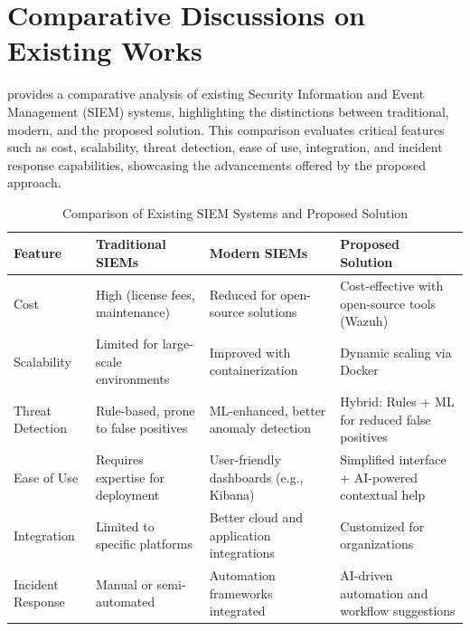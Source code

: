 \section{Comparative Discussions on Existing Works}
\label{sec_comparative_discussions}

 provides a comparative analysis of existing Security Information and Event Management (SIEM) systems, highlighting the distinctions between traditional, modern, and the proposed solution. This comparison evaluates critical features such as cost, scalability, threat detection, ease of use, integration, and incident response capabilities, showcasing the advancements offered by the proposed approach.

\begin{table}[h!]
\centering
\begin{tabular}{p{2.3cm}p{2.7cm}p{2.9cm}p{4cm}}
\hline
\textbf{Feature} & \textbf{Traditional SIEMs} & \textbf{Modern SIEMs} & \textbf{Proposed Solution} \\
\hline
Cost & High (license fees, maintenance) & Reduced for open-source solutions & Cost-effective with open-source tools (Wazuh) \\
Scalability & Limited for large-scale environments & Improved with containerization & Dynamic scaling via Docker \\
Threat Detection & Rule-based, prone to false positives & ML-enhanced, better anomaly detection & Hybrid: Rules + ML for reduced false positives \\
Ease of Use & Requires expertise for deployment & User-friendly dashboards (e.g., Kibana) & Simplified interface + AI-powered contextual help \\
Integration & Limited to specific platforms & Better cloud and application integrations & Customized for organizations \\
Incident Response & Manual or semi-automated & Automation frameworks integrated & AI-driven automation and workflow suggestions \\
\hline
\end{tabular}
\caption{Comparison of Existing SIEM Systems and Proposed Solution}
\label{tab:siem-comparison}
\end{table}
